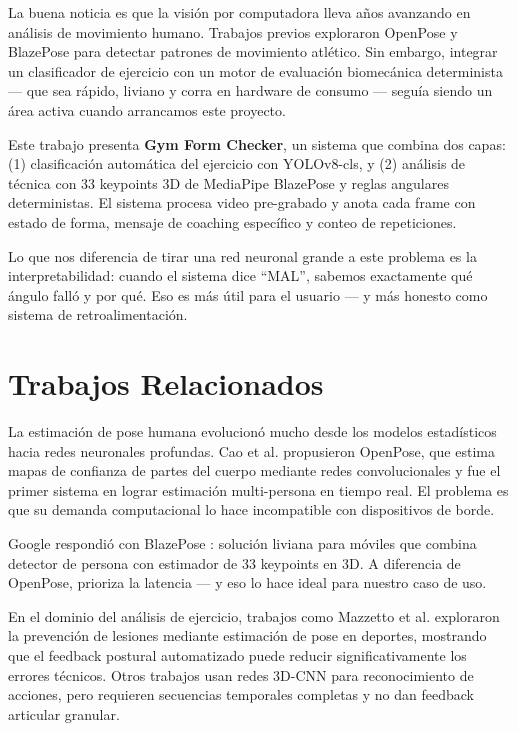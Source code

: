 \documentclass[conference]{IEEEtran}
\begin{document}
La buena noticia es que la visión por computadora lleva años avanzando en análisis de movimiento humano. Trabajos previos exploraron OpenPose \cite{ref2} y BlazePose \cite{ref4} para detectar patrones de movimiento atlético. Sin embargo, integrar un clasificador de ejercicio con un motor de evaluación biomecánica determinista — que sea rápido, liviano y corra en hardware de consumo — seguía siendo un área activa cuando arrancamos este proyecto.

Este trabajo presenta \textbf{Gym Form Checker}, un sistema que combina dos capas: (1) clasificación automática del ejercicio con YOLOv8-cls, y (2) análisis de técnica con 33 keypoints 3D de MediaPipe BlazePose y reglas angulares deterministas. El sistema procesa video pre-grabado y anota cada frame con estado de forma, mensaje de coaching específico y conteo de repeticiones.

Lo que nos diferencia de tirar una red neuronal grande a este problema es la interpretabilidad: cuando el sistema dice ``MAL'', sabemos exactamente qué ángulo falló y por qué. Eso es más útil para el usuario — y más honesto como sistema de retroalimentación.

\section{Trabajos Relacionados}

La estimación de pose humana evolucionó mucho desde los modelos estadísticos hacia redes neuronales profundas. Cao et al. \cite{ref2} propusieron OpenPose, que estima mapas de confianza de partes del cuerpo mediante redes convolucionales y fue el primer sistema en lograr estimación multi-persona en tiempo real. El problema es que su demanda computacional lo hace incompatible con dispositivos de borde.

Google respondió con BlazePose \cite{ref4}: solución liviana para móviles que combina detector de persona con estimador de 33 keypoints en 3D. A diferencia de OpenPose, prioriza la latencia — y eso lo hace ideal para nuestro caso de uso.

En el dominio del análisis de ejercicio, trabajos como Mazzetto et al. \cite{ref5} exploraron la prevención de lesiones mediante estimación de pose en deportes, mostrando que el feedback postural automatizado puede reducir significativamente los errores técnicos. Otros trabajos usan redes 3D-CNN para reconocimiento de acciones, pero requieren secuencias temporales completas y no dan feedback articular granular.
\end{document}
